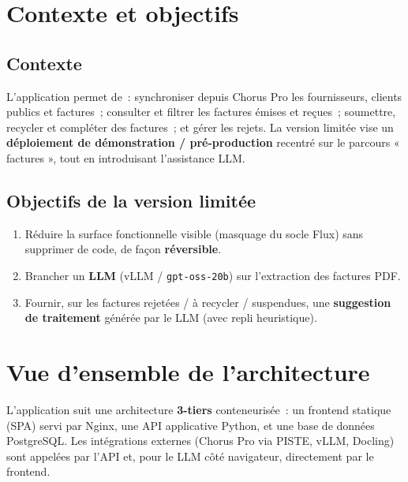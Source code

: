 \documentclass[11pt,a4paper]{article}
\newcommand{\code}[1]{\texttt{\small #1}}
\begin{document}
\section{Contexte et objectifs}

\subsection{Contexte}
L'application permet de~: synchroniser depuis Chorus Pro les fournisseurs,
clients publics et factures~; consulter et filtrer les factures émises et
reçues~; soumettre, recycler et compléter des factures~; et gérer les rejets.
La version limitée vise un \textbf{déploiement de démonstration / pré-production}
recentré sur le parcours « factures », tout en introduisant l'assistance LLM.

\subsection{Objectifs de la version limitée}
\begin{enumerate}[nosep]
  \item Réduire la surface fonctionnelle visible (masquage du socle Flux) sans
        supprimer de code, de façon \textbf{réversible}.
  \item Brancher un \textbf{LLM} (vLLM / \code{gpt-oss-20b}) sur l'extraction des
        factures PDF.
  \item Fournir, sur les factures rejetées / à recycler / suspendues, une
        \textbf{suggestion de traitement} générée par le LLM (avec repli
        heuristique).
\end{enumerate}

\section{Vue d'ensemble de l'architecture}

L'application suit une architecture \textbf{3-tiers} conteneurisée~: un frontend
statique (SPA) servi par Nginx, une API applicative Python, et une base de
données PostgreSQL. Les intégrations externes (Chorus Pro via PISTE, vLLM,
Docling) sont appelées par l'API et, pour le LLM côté navigateur, directement
par le frontend.
\end{document}
